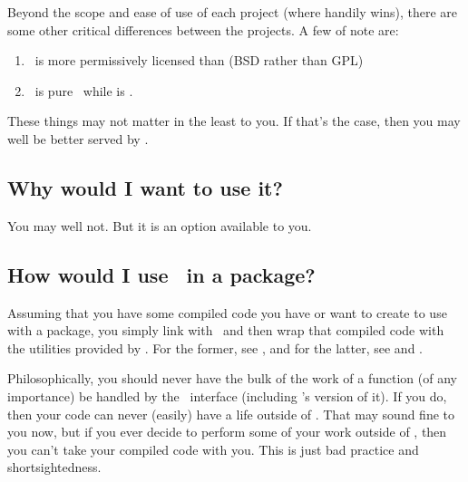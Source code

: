 Beyond the scope and ease of use of each project (where  handily wins), there are
some other critical differences between the projects.  A few of note are:

\begin{enumerate}
  \item \thispackage\ is more permissively licensed than  (BSD rather than GPL)
  \item \thispackage\ is pure \C\, while  is \Cpp.
\end{enumerate}

These things may not matter in the least to you.  If that's the case, then you
may well be better served by .


\subsection{Why would I want to use it?}

You may well not.  But it is an option available to you.


\subsection{How would I use \thispackage\ in a package?}

Assuming that you have some compiled code you have or want to create to use with a 
package, you simply link with \thispackage\ and then wrap that compiled code with 
the utilities provided by \thispackage.  For the former, see , 
and for the latter, see  and .

Philosophically, you should never have the bulk of the work of a function (of any
importance) be handled by the \R\ interface (including \thispackage's version of it).
If you do, then your code can never (easily) have a life outside of \R.  That may sound fine to you
now, but if you ever decide to perform some of your work outside of \R, then you can't take
your compiled code with you.  This is just bad practice and shortsightedness.  



